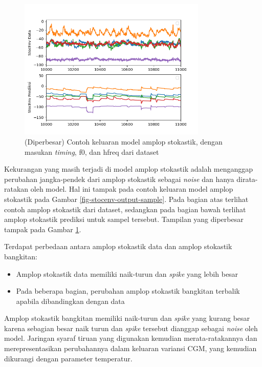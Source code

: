 \begin{figure}[htbp]
    \centering
    \includegraphics[width=0.8\textwidth]{resources/Analisis_StocEnv_zoomed.png}
    \caption{(Diperbesar) Contoh keluaran model amplop stokastik, dengan masukan \textit{timing}, f0, dan hfreq dari dataset}\label{fig-stocenv-output-sample-zoomed}
\end{figure}

Kekurangan yang masih terjadi di model amplop stokastik adalah menganggap perubahan jangka-pendek dari amplop stokastik sebagai \textit{noise} dan hanya dirata-ratakan oleh model. Hal ini tampak pada contoh keluaran model amplop stokastik pada Gambar \ref{fig-stocenv-output-sample}. Pada bagian atas terlihat contoh amplop stokastik dari dataset, sedangkan pada bagian bawah terlihat amplop stokastik prediksi untuk sampel tersebut. Tampilan yang diperbesar tampak pada Gambar \ref{fig-stocenv-output-sample-zoomed}.

Terdapat perbedaan antara amplop stokastik data dan amplop stokastik bangkitan:

\begin{itemize}
	\item Amplop stokastik data memiliki naik-turun dan \textit{spike} yang lebih besar
	\item Pada beberapa bagian, perubahan amplop stokastik bangkitan terbalik apabila dibandingkan dengan data
\end{itemize}

Amplop stokastik bangkitan memiliki naik-turun dan \textit{spike} yang kurang besar karena sebagian besar naik turun dan \textit{spike} tersebut dianggap sebagai \textit{noise} oleh model. Jaringan syaraf tiruan yang digunakan kemudian merata-ratakannya dan merepresentasikan perubahannya dalam keluaran variansi CGM, yang kemudian dikurangi dengan parameter temperatur.

